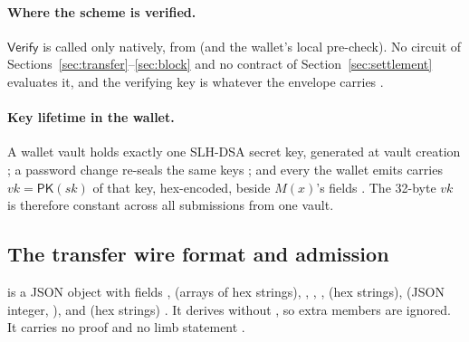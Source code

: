 \paragraph{Where the scheme is verified.} $\mathsf{Verify}$ is called only
natively, from 
 (and the wallet's local pre-check). No
circuit of Sections~\ref{sec:transfer}--\ref{sec:block} and no contract of
Section~\ref{sec:settlement} evaluates it, and the verifying key is whatever
the envelope carries .

\paragraph{Key lifetime in the wallet.} A wallet vault holds exactly one
SLH-DSA secret key, generated at vault creation
; a password change re-seals the
same keys ; and every
 the wallet emits carries
$vk=\mathsf{PK}(sk)$ of that key, hex-encoded, beside $M(x)$'s fields
. The 32-byte $vk$ is
therefore constant across all submissions from one vault.

\subsection{The transfer wire format and  admission}
\label{subsec:app-wire}

\begin{definition}
\label{def:app-wire}
 is a JSON object with fields
,  (arrays of hex strings), ,
, ,
 (hex strings),  (JSON integer,
),  and  (hex strings)
. It derives  without
, so extra members are ignored. It carries no
proof and no limb statement .
\end{definition}

